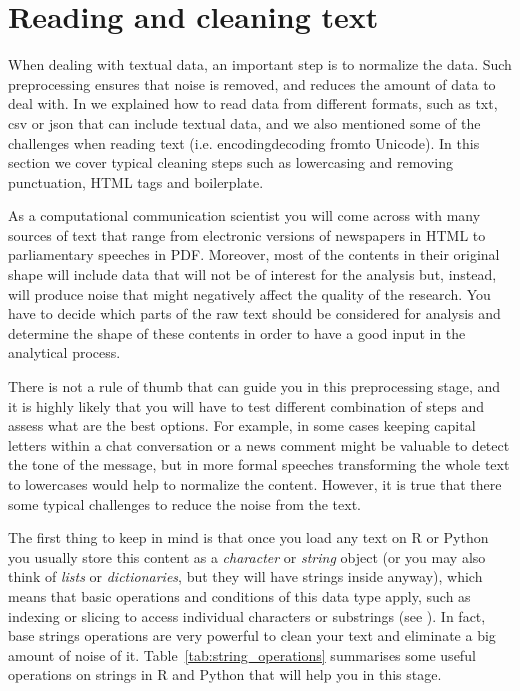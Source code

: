 \section{Reading and cleaning text}
\label{sec:readtext}

When dealing with textual data, an important step is to normalize the data. Such preprocessing ensures that noise is removed, and reduces the amount of data to deal with. In  we explained how to read data from different formats, such as txt, csv or json that can include textual data, and we also mentioned some of the challenges when reading text (i.e. encoding\/decoding from\/to Unicode). In this section we cover typical cleaning steps such as lowercasing and removing punctuation, HTML tags and boilerplate.
 
As a computational communication scientist you will come across with many sources of text that range from electronic versions of newspapers in HTML to parliamentary speeches in PDF. Moreover, most of the contents in their original shape will include data that will not be of interest for the analysis but, instead,  will produce noise that might negatively affect the quality of the research. You have to decide which parts of the raw text should be considered for analysis and determine the shape of these contents in order to have a good input in the analytical process. 

There is not a rule of thumb that can guide you in this preprocessing stage, and it is highly likely that you will have to test different combination of steps and assess what are the best options. For example, in some cases keeping capital letters within a chat conversation or a news comment might be valuable to detect the tone of the message, but in more formal speeches transforming the whole text to lowercases would help to normalize the content. However, it is true that there some typical challenges to reduce the noise from the text.

The first thing to keep in mind is that once you load any text on R or Python you usually store this content as a \emph{character} or \emph{string} object (or you may also think of \emph{lists} or \emph{dictionaries}, but they will have strings inside anyway), which means that basic operations and conditions of this data type apply, such as indexing or slicing to access individual characters or substrings (see ). In fact, base strings operations are very powerful to clean your text and eliminate a big amount of noise of it.  Table~\ref{tab:string_operations} summarises some useful operations on strings in R and Python that will help you in this stage.   

